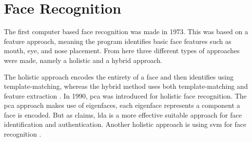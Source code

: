 \section{Face Recognition}
The first computer based face recognition was made in 1973. This was based on a feature approach, meaning the program identifies basic face features such as mouth, eye, and nose placement. 
From here three different types of approaches were made, namely a holistic and a hybrid approach. 

The holistic approach encodes the entirety of a face and then identifies using template-matching, whereas the hybrid method uses both template-matching and feature extraction \citep{Wechsler2007}.
In 1990, \gls{pca} was introduced for holistic face recognition. The \gls{pca} approach makes use of eigenfaces, each eigenface represents a component a face is encoded. But as \cite{Wechsler2007} claims, \gls{lda} is a more effective suitable approach for face identification and authentication. Another holistic approach is using \gls{svm} for face recognition \citep{Wechsler2007}.